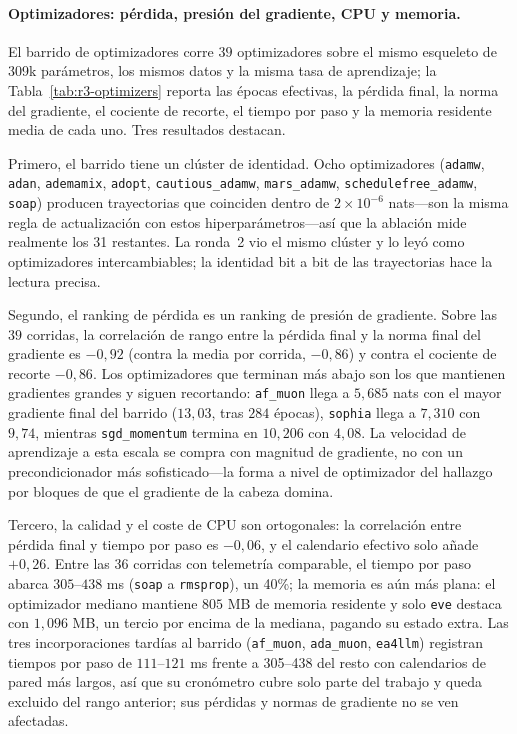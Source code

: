 \paragraph{Optimizadores: pérdida, presión del gradiente, CPU y memoria.}
El barrido de optimizadores corre $39$ optimizadores sobre el mismo esqueleto de 309k parámetros, los mismos datos y la misma tasa de aprendizaje; la Tabla~\ref{tab:r3-optimizers} reporta las épocas efectivas, la pérdida final, la norma del gradiente, el cociente de recorte, el tiempo por paso y la memoria residente media de cada uno. Tres resultados destacan.

Primero, el barrido tiene un clúster de identidad. Ocho optimizadores (\texttt{adamw}, \texttt{adan}, \texttt{ademamix}, \texttt{adopt}, \texttt{cautious\_adamw}, \texttt{mars\_adamw}, \texttt{schedulefree\_adamw}, \texttt{soap}) producen trayectorias que coinciden dentro de $2\times10^{-6}$ nats---son la misma regla de actualización con estos hiperparámetros---así que la ablación mide realmente los 31 restantes. La ronda~2 vio el mismo clúster y lo leyó como optimizadores intercambiables; la identidad bit a bit de las trayectorias hace la lectura precisa.

Segundo, el ranking de pérdida es un ranking de presión de gradiente. Sobre las $39$ corridas, la correlación de rango entre la pérdida final y la norma final del gradiente es $-0,92$ (contra la media por corrida, $-0,86$) y contra el cociente de recorte $-0,86$. Los optimizadores que terminan más abajo son los que mantienen gradientes grandes y siguen recortando: \texttt{af\_muon} llega a $5,685$ nats con el mayor gradiente final del barrido ($13,03$, tras $284$ épocas), \texttt{sophia} llega a $7,310$ con $9,74$, mientras \texttt{sgd\_momentum} termina en $10,206$ con $4,08$. La velocidad de aprendizaje a esta escala se compra con magnitud de gradiente, no con un precondicionador más sofisticado---la forma a nivel de optimizador del hallazgo por bloques de que el gradiente de la cabeza domina.

Tercero, la calidad y el coste de CPU son ortogonales: la correlación entre pérdida final y tiempo por paso es $-0,06$, y el calendario efectivo solo añade $+0,26$. Entre las 36 corridas con telemetría comparable, el tiempo por paso abarca $305$--$438$ ms (\texttt{soap} a \texttt{rmsprop}), un 40\%; la memoria es aún más plana: el optimizador mediano mantiene $805$ MB de memoria residente y solo \texttt{eve} destaca con $1{,}096$ MB, un tercio por encima de la mediana, pagando su estado extra. Las tres incorporaciones tardías al barrido (\texttt{af\_muon}, \texttt{ada\_muon}, \texttt{ea4llm}) registran tiempos por paso de $111$--$121$ ms frente a 305--438 del resto con calendarios de pared más largos, así que su cronómetro cubre solo parte del trabajo y queda excluido del rango anterior; sus pérdidas y normas de gradiente no se ven afectadas.

